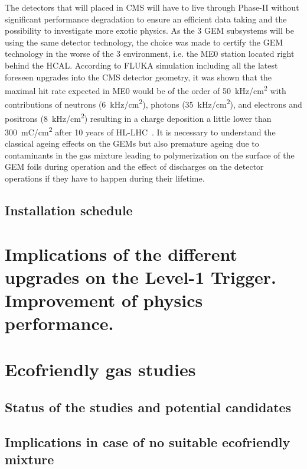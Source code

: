 	The detectors that will placed in CMS will have to live through Phase-II without significant performance degradation to ensure an efficient data taking and the possibility to investigate more exotic physics. As the 3 GEM subsystems will be using the same detector technology, the choice was made to certify the GEM technology in the worse of the 3 environment, i.e. the ME0 station located right behind the HCAL. According to FLUKA simulation including all the latest foreseen upgrades into the CMS detector geometry, it was shown that the maximal hit rate expected in ME0 would be of the order of \SI{50}{kHz/cm^2} with contributions of neutrons (\SI{6}{kHz/cm^2}), photons (\SI{35}{kHz/cm^2}), and electrons and positrons (\SI{8}{kHz/cm^2}) resulting in a charge deposition a little lower than \SI{300}{mC/cm^2} after 10 years of HL-LHC~\cite{PHASEIITP}. It is necessary to understand the classical ageing effects on the GEMs but also premature ageing due to contaminants in the gas mixture leading to polymerization on the surface of the GEM foils during operation and the effect of discharges on the detector operations if they have to happen during their lifetime.
	
	\subsection{Installation schedule}
	\label{chapt3:ssec:schedule}
	
	

\section{Implications of the different upgrades on the Level-1 Trigger. Improvement of physics performance.}
\label{chapt3:sec:L1tP2}

\section{Ecofriendly gas studies}
\label{chapt3:sec:EcoGas}

	\subsection{Status of the studies and potential candidates}
	\label{chapt3:ssec:GasStatus}

	\subsection{Implications in case of no suitable ecofriendly mixture}
	\label{chapt3:ssec:GasConsequences}

\clearpage{\pagestyle{empty}\cleardoublepage}